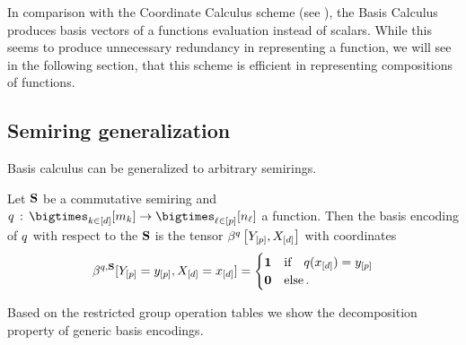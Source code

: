 In comparison with the Coordinate Calculus scheme (see ), the Basis Calculus produces basis vectors of a functions evaluation instead of scalars.
While this seems to produce unnecessary redundancy in representing a function, we will see in the following section, that this scheme is efficient in representing compositions of functions.


\subsection{Semiring generalization} %


Basis calculus can be generalized to arbitrary semirings.

\begin{definition}
    Let $\mathbf{S}$ be a commutative semiring and $\exfunction \wcols \facstates \rightarrow \headstates$ a function.
    Then the basis encoding of $q$ with respect to the $\mathbf{S}$ is the tensor $\bencodingofat{\exfunction}{\headvariables,\shortcatvariables}$ with coordinates
    \begin{align*}
        \beta^{q,\mathbf{S}}[Y_{[p]}=y_{[p]},X_{[d]}=x_{[d]}]
        = \begin{cases}
              \mathbf{1} & \text{if}\quad q(x_{[d]}) = y_{[p]} \\
              \mathbf{0} & \text{else} \, .
        \end{cases}
    \end{align*}
\end{definition}

Based on the restricted group operation tables we show the decomposition property of generic basis encodings.

